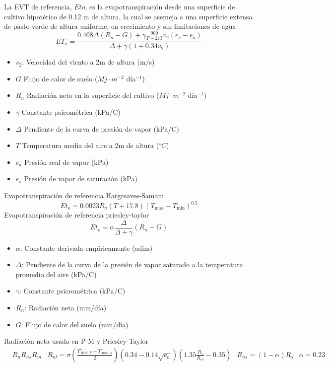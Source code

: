 La EVT de referencia, $Eto$, es la evapotranspiración desde una superficie de cultivo hipotético de 0.12 m de altura, la cual se asemeja a una superficie extensa de pasto verde de altura uniforme, en crecimiento y sin limitaciones de agua
\begin{equation}
    ET_o =\frac{0.408\Delta\left(R_n - G\right) +\gamma\frac{900}{T + 273}v_2\left(e_s - e_a\right)}{\Delta + \gamma\left(1 + 0.34v_2\right)}
\end{equation}
\begin{notation}
    \begin{itemize}
        \item $v_2$: Velocidad del viento a 2m de altura (m/s)
        \item $G$ Flujo de calor de suelo ($Mj\cdot m^{-2}$ día$^{-1}$)
        \item $R_n$ Radiación neta en la superficie del cultivo ($Mj\cdot m^{-2}$ día$^{-1}$)
        \item $\gamma$ Constante psicométrica (kPa/C)
        \item $\Delta$ Pendiente de la curva de presión de vapor (kPa/C)
        \item $T$ Temperatura media del aire a 2m de altura ($^{\circ}C$)
        \item $e_a$ Presión real de vapor (kPa)
        \item $e_s$ Presión de vapor de saturación (kPa)
    \end{itemize}
\end{notation}
Evapotranspiración de referencia Hargreaves-Samani
\begin{equation}
        Et_o = 0.0023R_a\left(T + 17.8\right)\left(T_{\max } - T_{\min }\right)^{0.5}
\end{equation}
Evapotranspiración de referencia priesley-taylor
\begin{equation}
    Et_o =\alpha\frac{\Delta}{\Delta +\gamma}\left(R_n - G\right)
\end{equation}
\begin{notation}
    \begin{itemize}
        \item $\alpha$: Constante derivada empíricamente (adim)
        \item $\Delta$: Pendiente de la curva de la presión de vapor saturado a la temperatura promedio del aire (kPa/C)
        \item $\gamma$: Constante psicrométrica (kPa/C)
        \item $R_n$: Radiación neta (mm/día)
        \item $G$: Flujo de calor del suelo (mm/día)
    \end{itemize}
\end{notation}
Radiación neta usada en P-M y Priesley-Taylor
\begin{align}
    &R_n R_{ns} R_{nl}
    &R_{nl} =\sigma\left(\frac{T^4_{\max,k } -T^4_{\min,k }}{2}\right)\left(0.34 -0.14 \sqrt{e_a}\right)\left(1.35\frac{R_s}{R_{so}} - 0.35\right)
    &R_{ns} =\left(1 -\alpha\right)R_s
    &\alpha = 0.23
\end{align}

